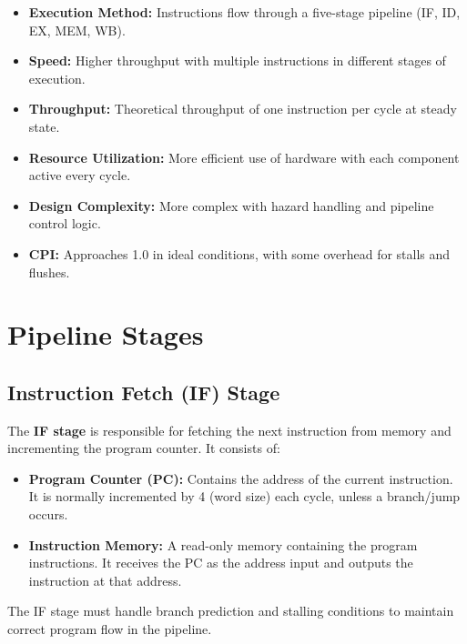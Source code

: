 \documentclass[conference]{IEEEtran}
\begin{document}
\begin{itemize}
    \item \textbf{Execution Method:} Instructions flow through a five-stage pipeline (IF, ID, EX, MEM, WB).
    
    \item \textbf{Speed:} Higher throughput with multiple instructions in different stages of execution.
    
    \item \textbf{Throughput:} Theoretical throughput of one instruction per cycle at steady state.
    
    \item \textbf{Resource Utilization:} More efficient use of hardware with each component active every cycle.
    
    \item \textbf{Design Complexity:} More complex with hazard handling and pipeline control logic.
    
    \item \textbf{CPI:} Approaches 1.0 in ideal conditions, with some overhead for stalls and flushes.
\end{itemize}

\section{Pipeline Stages}
\subsection{Instruction Fetch (IF) Stage}

The \textbf{IF stage} is responsible for fetching the next instruction from memory and incrementing the program counter. It consists of:

\begin{itemize}
    \item \textbf{Program Counter (PC):} Contains the address of the current instruction. It is normally incremented by 4 (word size) each cycle, unless a branch/jump occurs.
    
    \item \textbf{Instruction Memory:} A read-only memory containing the program instructions. It receives the PC as the address input and outputs the instruction at that address.
\end{itemize}

The IF stage must handle branch prediction and stalling conditions to maintain correct program flow in the pipeline.
\end{document}
